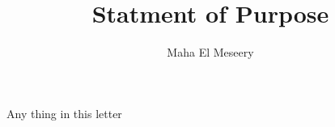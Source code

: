 \documentclass[a4paper,12pt]{article}%
\begin{document}
\title{ Statment of Purpose}
\author{Maha El Meseery}
 
\date{ }
 
\maketitle 

%


Any thing in this letter 
\end{document}
